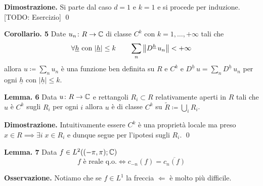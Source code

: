 \textbf{Dimostrazione.}
Si parte dal caso $d = 1$ e $k = 1$ e si procede per induzione. [TODO: Esercizio]
\qed

\textbf{Corollario. 5}
Date $u_n \colon R \to \mathbb C$ di classe $C^k$ con $k = 1, \dots, +\infty$ tali che
$$
\forall \underline h \text{ con } |\underline h| \leq k \qquad \sum_n \left\lVert D^{\underline h} \, u_n \right\rVert < +\infty
$$
allora $u \coloneqq \sum_n u_n$ è una funzione ben definita su $R$ e $C^k$ e $D^{\underline h} \, u = \sum_n D^{\underline h} \, u_n$ per ogni $\underline h$ con $|\underline h| \leq k$.

\textbf{Lemma. 6}
Data $u \colon R \to \mathbb C$ e rettangoli $R_i \subset R$ relativamente aperti in $R$ tali che $u$ è $C^k$ sugli $R_i$ per ogni $i$ allora $u$ è di classe $C^k$ su $\tilde R \coloneqq \bigcup_i R_i$.

\textbf{Dimostrazione.}
Intuitivamente essere $C^k$ è una proprietà locale ma preso $x \in R \implies \exists i \; x \in R_i$ e dunque segue per l'ipotesi sugli $R_i$.
\qed

\textbf{Lemma. 7}
Data $f \in L^2((-\pi, \pi); \mathbb C)$
$$
f \text{ è reale q.o.} \iff c_{-n}(f) = \overline{c_n(f)}
$$

\textbf{Osservazione.}
Notiamo che se $f \in L^1$ la freccia $\boxed{\Leftarrow}$ è molto più difficile.

